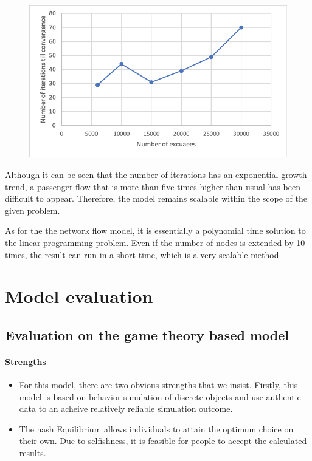 \documentclass{mcmthesis}
\begin{document}
\begin{figure}
	\centering
	\includegraphics[width=0.7\linewidth]{../../Figure/screenshot008}
	\caption{}
	\label{fig:screenshot008}
\end{figure}
Although it can be seen that the number of iterations has an exponential growth trend, a passenger flow that is more than five times higher than  usual has been difficult to appear. Therefore, the model remains scalable within the scope of the given problem.

As for the the network flow model, it is essentially a polynomial time solution to the linear programming problem. Even if the number of nodes is extended by 10 times, the result can  run in a short time, which is a very scalable method.
\section{Model evaluation}
\subsection{Evaluation on the game theory based model}
\paragraph{Strengths}

\begin{itemize}
	\item  For this model, there are two obvious strengths that we insist. Firstly, this model is based on  behavior simulation of discrete objects and use authentic data to an acheive relatively reliable simulation outcome. 
	\item The nash Equilibrium allows individuals to attain the optimum choice on their own. Due to selfishness, it is feasible for people to accept the calculated results.
\end{itemize}
\end{document}
